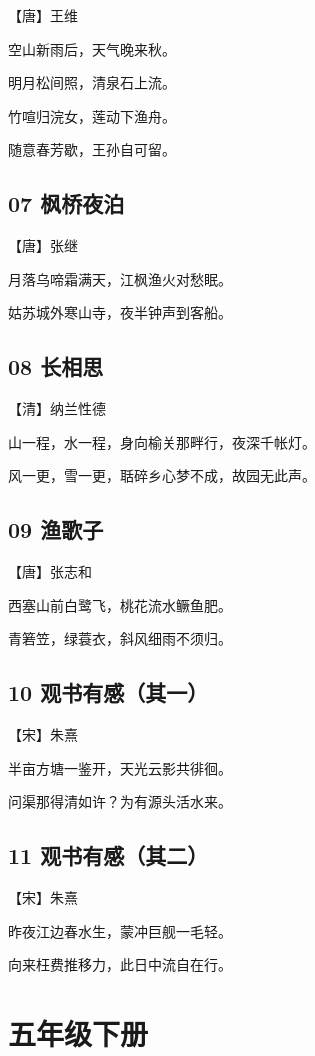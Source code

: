 \documentclass[12pt]{article}
\begin{document}
【唐】王维

空山新雨后，天气晚来秋。

明月松间照，清泉石上流。

竹喧归浣女，莲动下渔舟。

随意春芳歇，王孙自可留。

\subsection*{07 枫桥夜泊}

【唐】张继

月落乌啼霜满天，江枫渔火对愁眠。

姑苏城外寒山寺，夜半钟声到客船。

\subsection*{08 长相思}

【清】纳兰性德

山一程，水一程，身向榆关那畔行，夜深千帐灯。

风一更，雪一更，聒碎乡心梦不成，故园无此声。

\subsection*{09 渔歌子}

【唐】张志和

西塞山前白鹭飞，桃花流水鳜鱼肥。

青箬笠，绿蓑衣，斜风细雨不须归。

\subsection*{10 观书有感（其一）}

【宋】朱熹

半亩方塘一鉴开，天光云影共徘徊。

问渠那得清如许？为有源头活水来。

\subsection*{11 观书有感（其二）}

【宋】朱熹

昨夜江边春水生，蒙冲巨舰一毛轻。

向来枉费推移力，此日中流自在行。

\newpage

\section*{五年级下册}
\end{document}
